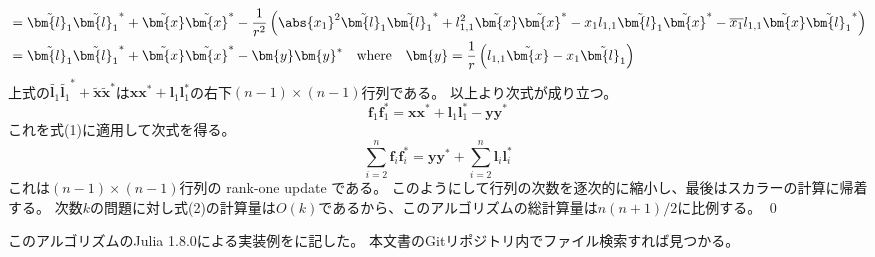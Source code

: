 \begin{derivation*}
\begin{align*}
                &= \tilde{\bm{l}_1}\tilde{\bm{l}_1}^* + \tilde{\bm{x}}\tilde{\bm{x}}^* - \frac{1}{r^2}\left(\abs{x_1}^2\tilde{\bm{l}_1}\tilde{\bm{l}_1}^* + l_{1,1}^2\tilde{\bm{x}}\tilde{\bm{x}}^* - x_1l_{1,1}\tilde{\bm{l}_1}\tilde{\bm{x}}^* - \overline{x_1}l_{1,1}\tilde{\bm{x}}\tilde{\bm{l}_1}^*\right) \\
                &= \tilde{\bm{l}_1}\tilde{\bm{l}_1}^* + \tilde{\bm{x}}\tilde{\bm{x}}^* - \bm{y}\bm{y}^* \quad \text{where} \quad \bm{y} = \frac{1}{r}\left(l_{1,1}\tilde{\bm{x}} - x_1\tilde{\bm{l}_1}\right)
            \end{align*}
            上式の$\tilde{\bm{l}_1}\tilde{\bm{l}_1}^* + \tilde{\bm{x}}\tilde{\bm{x}}^*$は$\bm{x}\bm{x}^* + \bm{l}_1\bm{l}_1^*$の右下$(n-1)\times(n-1)$行列である。
            以上より次式が成り立つ。
            \[ \bm{f}_1\bm{f}_1^* = \bm{x}\bm{x}^* + \bm{l}_1\bm{l}_1^* - \bm{y}\bm{y}^* \]
            これを式(1)に適用して次式を得る。
            \[ \sum_{i=2}^n \bm{f}_i\bm{f}_i^* = \bm{y}\bm{y}^* + \sum_{i=2}^n \bm{l}_i\bm{l}_i^* \]
            これは$(n-1)\times(n-1)$行列の rank-one update である。
            このようにして行列の次数を逐次的に縮小し、最後はスカラーの計算に帰着する。
            次数$k$の問題に対し式(2)の計算量は$O(k)$であるから、このアルゴリズムの総計算量は$n(n+1)/2$に比例する。
            \qed
        \end{derivation*}
        このアルゴリズムのJulia 1.8.0による実装例をに記した。
        本文書のGitリポジトリ内でファイル検索すれば見つかる。
